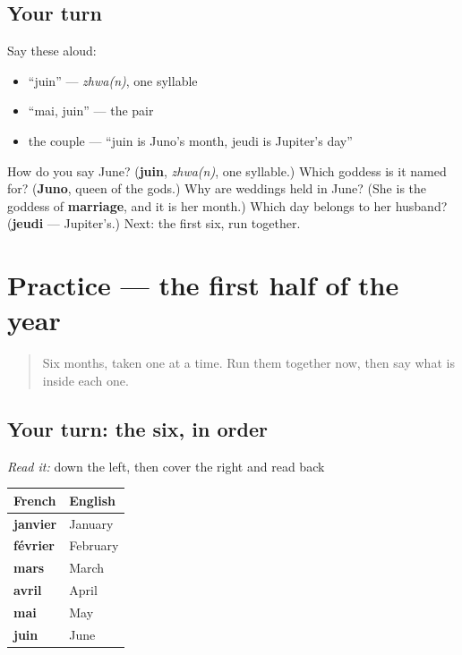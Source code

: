 \subsection*{Your turn}
Say these aloud:

\begin{itemize}
\raggedright
  \item \textquotedblleft{}juin\textquotedblright{} — \emph{zhwa(n)}, one syllable
  \item \textquotedblleft{}mai, juin\textquotedblright{} — the pair
  \item the couple — \textquotedblleft{}juin is Juno's month, jeudi is Jupiter's day\textquotedblright{}
\end{itemize}

\begin{tcolorbox}[breakable,colback=teal!4,colframe=teal!35!black,title={Before you move on}]
How do you say June? (\textbf{juin}, \emph{zhwa(n)}, one syllable.) Which goddess is it named for? (\textbf{Juno}, queen of the gods.) Why are weddings held in June? (She is the goddess of \textbf{marriage}, and it is her month.) Which day belongs to her husband? (\textbf{jeudi} — Jupiter's.) Next: the first six, run together.
\end{tcolorbox}
\section[Practice]{Practice — the first half of the year}

\label{lesson:FR-C09-mois-practice-1}



\begin{quote}
Six months, taken one at a time. Run them together now, then say what is inside each one.
\end{quote}

\subsection*{Your turn: the six, in order}
\emph{Read it:} down the left, then cover the right and read back

\noindent
\begin{tabularx}{\linewidth}{@{}>{\raggedright\arraybackslash}X>{\raggedright\arraybackslash}X@{}}
\toprule
\textbf{French} & \textbf{English} \\
\midrule
\textbf{janvier} & January \\
\textbf{février} & February \\
\textbf{mars} & March \\
\textbf{avril} & April \\
\textbf{mai} & May \\
\textbf{juin} & June \\
\bottomrule
\end{tabularx}


